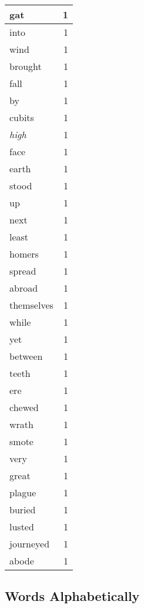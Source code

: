 \begin{center}
\begin{longtable}{l|r}
gat & 1 \\ \hline
into & 1 \\ \hline
wind & 1 \\ \hline
brought & 1 \\ \hline
fall & 1 \\ \hline
by & 1 \\ \hline
cubits & 1 \\ \hline
\emph{high} & 1 \\ \hline
face & 1 \\ \hline
earth & 1 \\ \hline
stood & 1 \\ \hline
up & 1 \\ \hline
next & 1 \\ \hline
least & 1 \\ \hline
homers & 1 \\ \hline
spread & 1 \\ \hline
abroad & 1 \\ \hline
themselves & 1 \\ \hline
while & 1 \\ \hline
yet & 1 \\ \hline
between & 1 \\ \hline
teeth & 1 \\ \hline
ere & 1 \\ \hline
chewed & 1 \\ \hline
wrath & 1 \\ \hline
smote & 1 \\ \hline
very & 1 \\ \hline
great & 1 \\ \hline
plague & 1 \\ \hline
buried & 1 \\ \hline
lusted & 1 \\ \hline
journeyed & 1 \\ \hline
abode & 1 \\ \hline
\end{longtable}
\end{center}



\normalsize



\subsection{Words Alphabetically}

